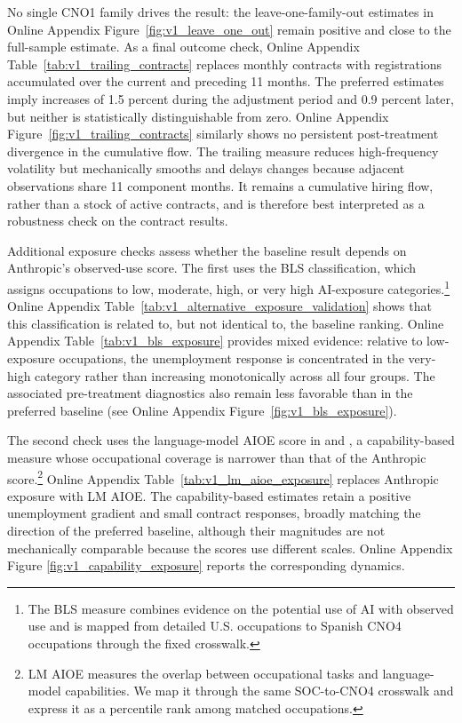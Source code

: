 \documentclass[11pt]{article}
\begin{document}
No single CNO1 family drives the result: the leave-one-family-out estimates in Online Appendix Figure~\ref{fig:v1_leave_one_out} remain positive and close to the full-sample estimate. As a final outcome check, Online Appendix Table~\ref{tab:v1_trailing_contracts} replaces monthly contracts with registrations accumulated over the current and preceding 11 months. The preferred estimates imply increases of 1.5 percent during the adjustment period and 0.9 percent later, but neither is statistically distinguishable from zero. Online Appendix Figure~\ref{fig:v1_trailing_contracts} similarly shows no persistent post-treatment divergence in the cumulative flow. The trailing measure reduces high-frequency volatility but mechanically smooths and delays changes because adjacent observations share 11 component months. It remains a cumulative hiring flow, rather than a stock of active contracts, and is therefore best interpreted as a robustness check on the contract results.

Additional exposure checks assess whether the baseline result depends on Anthropic's observed-use score. The first uses the BLS classification, which assigns occupations to low, moderate, high, or very high AI-exposure categories.\footnote{The BLS measure combines evidence on the potential use of AI with observed use and is mapped from detailed U.S. occupations to Spanish CNO4 occupations through the fixed crosswalk.} Online Appendix Table~\ref{tab:v1_alternative_exposure_validation} shows that this classification is related to, but not identical to, the baseline ranking. Online Appendix Table~\ref{tab:v1_bls_exposure} provides mixed evidence: relative to low-exposure occupations, the unemployment response is concentrated in the very-high category rather than increasing monotonically across all four groups. The associated pre-treatment diagnostics also remain less favorable than in the preferred baseline (see Online Appendix Figure~\ref{fig:v1_bls_exposure}).

The second check uses the language-model AIOE score in \citet{felten_raj_seamans_2021} and \citet{felten_raj_seamans_2023}, a capability-based measure whose occupational coverage is narrower than that of the Anthropic score.\footnote{LM AIOE measures the overlap between occupational tasks and language-model capabilities. We map it through the same SOC-to-CNO4 crosswalk and express it as a percentile rank among matched occupations.} Online Appendix Table~\ref{tab:v1_lm_aioe_exposure} replaces Anthropic exposure with LM AIOE. The capability-based estimates retain a positive unemployment gradient and small contract responses, broadly matching the direction of the preferred baseline, although their magnitudes are not mechanically comparable because the scores use different scales. Online Appendix Figure \ref{fig:v1_capability_exposure} reports the corresponding dynamics.
\end{document}
